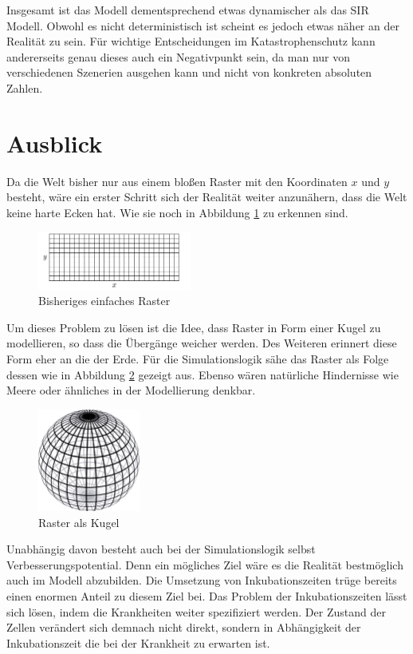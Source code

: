 \documentclass[10pt,twocolumn]{scrartcl}
\begin{document}
Insgesamt ist das Modell dementsprechend etwas dynamischer als das SIR Modell. Obwohl es nicht deterministisch ist scheint es jedoch etwas näher an der Realität zu sein. Für wichtige Entscheidungen im Katastrophenschutz kann andererseits genau dieses auch ein Negativpunkt sein, da man nur von verschiedenen Szenerien ausgehen kann und nicht von konkreten absoluten Zahlen.

\section*{Ausblick}
Da die Welt bisher nur aus einem bloßen Raster mit den Koordinaten $x$ und $y$ besteht, wäre ein erster Schritt sich der Realität weiter anzunähern, dass die Welt keine harte Ecken hat. Wie sie noch in Abbildung \ref{fig:welt} zu erkennen sind.
\begin{figure}[H]
	\centering
	\includegraphics[width= 0.45\textwidth]{./images/map.png}
	\caption{Bisheriges einfaches Raster}
	\label{fig:welt}
\end{figure}
Um dieses Problem zu lösen ist die Idee, dass Raster in Form einer Kugel zu modellieren, so dass die Übergänge weicher werden. Des Weiteren erinnert diese Form eher an die der Erde. Für die Simulationslogik sähe das Raster als Folge dessen wie in Abbildung \ref{fig:kugel} gezeigt aus. Ebenso wären natürliche Hindernisse wie Meere oder ähnliches in der Modellierung denkbar.
\begin{figure}[H]
	\centering
	\includegraphics[width= 0.3\textwidth]{./images/kugel.pdf}
	\caption{Raster als Kugel \cite{WikiKugel:2014}}
	\label{fig:kugel}
\end{figure}


Unabhängig davon besteht auch bei der Simulationslogik selbst Verbesserungspotential. Denn ein mögliches Ziel wäre es die Realität bestmöglich auch im Modell abzubilden.
Die Umsetzung von Inkubationszeiten trüge bereits einen enormen Anteil zu diesem Ziel bei. 
Das Problem der Inkubationszeiten lässt sich lösen, indem die Krankheiten weiter spezifiziert werden. Der Zustand der Zellen verändert sich demnach nicht direkt, sondern in Abhängigkeit der Inkubationszeit die bei der Krankheit zu erwarten ist.
\end{document}
